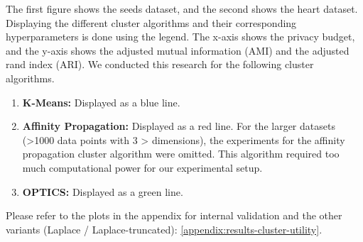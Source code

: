 The first figure shows the seeds dataset, and the second shows the heart dataset. \newline
Displaying the different cluster algorithms and their corresponding hyperparameters is done using the legend.
The x-axis shows the privacy budget, and the y-axis shows the adjusted mutual information (AMI) and the adjusted rand index (ARI).
We conducted this research for the following cluster algorithms.
\begin{enumerate}
    \item \textbf{K-Means:} Displayed as a blue line.
    \item \textbf{Affinity Propagation:} Displayed as a red line.
          For the larger datasets (>1000 data points with 3 > dimensions), the experiments for the affinity propagation cluster algorithm were omitted.
          This algorithm required too much computational power for our experimental setup.
    \item \textbf{OPTICS:} Displayed as a green line.
\end{enumerate}

Please refer to the plots in the appendix for internal validation and the other variants (Laplace / Laplace-truncated): \ref{appendix:results-cluster-utility}.

